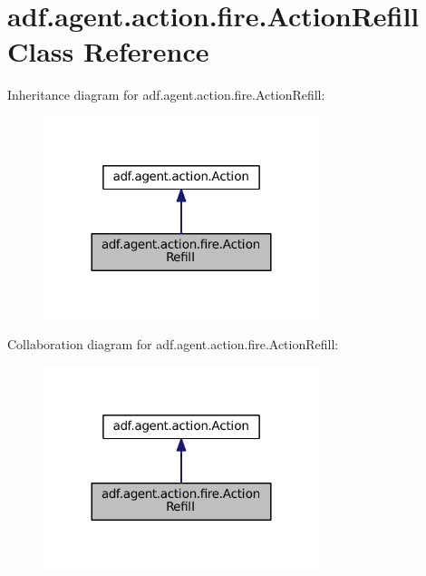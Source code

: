\hypertarget{classadf_1_1agent_1_1action_1_1fire_1_1ActionRefill}{}\section{adf.\+agent.\+action.\+fire.\+Action\+Refill Class Reference}
\label{classadf_1_1agent_1_1action_1_1fire_1_1ActionRefill}


Inheritance diagram for adf.\+agent.\+action.\+fire.\+Action\+Refill\+:
\nopagebreak
\begin{figure}[H]
\begin{center}
\leavevmode
\includegraphics[width=228pt]{classadf_1_1agent_1_1action_1_1fire_1_1ActionRefill__inherit__graph}
\end{center}
\end{figure}


Collaboration diagram for adf.\+agent.\+action.\+fire.\+Action\+Refill\+:
\nopagebreak
\begin{figure}[H]
\begin{center}
\leavevmode
\includegraphics[width=228pt]{classadf_1_1agent_1_1action_1_1fire_1_1ActionRefill__coll__graph}
\end{center}
\end{figure}
